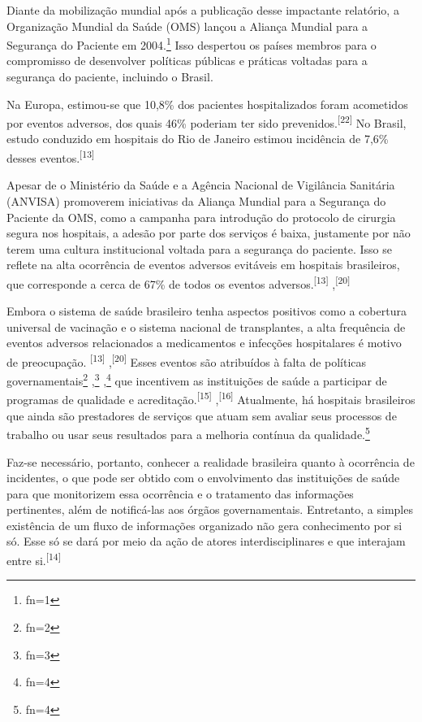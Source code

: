 \documentclass{article}
\makeatletter
\newcommand{\fn}{\afterassignment\fn@aux\count0=}
\newcommand{\fn@aux}{\csname fn\the\count0\endcsname}
\makeatother
\begin{document}
Diante da mobilização mundial após a publicação desse impactante relatório, a
Organização
Mundial da Saúde (OMS) lançou a Aliança Mundial para a Segurança do Paciente em
2004.\footnote{\fn1}
Isso despertou os países membros para o compromisso de desenvolver políticas
públicas e práticas voltadas para a segurança do paciente, incluindo o Brasil.

Na Europa, estimou-se que 10,8\% dos pacientes hospitalizados foram acometidos
por eventos
adversos, dos quais 46\% poderiam ter sido prevenidos.\textsuperscript{[22]}
No Brasil, estudo conduzido em hospitais do Rio de Janeiro estimou incidência de
7,6\% desses eventos.\textsuperscript{[13]}

Apesar de o Ministério da Saúde e a Agência Nacional de Vigilância Sanitária
(ANVISA)
promoverem iniciativas da Aliança Mundial para a Segurança do Paciente da OMS,
como a
campanha para introdução do protocolo de cirurgia segura nos hospitais, a adesão
por parte
dos serviços é baixa, justamente por não terem uma cultura institucional voltada
para a
segurança do paciente. Isso se reflete na alta ocorrência de eventos adversos
evitáveis em
hospitais brasileiros, que corresponde a cerca de 67\% de todos os eventos
adversos.\textsuperscript{[13]}
,\textsuperscript{[20]}

Embora o sistema de saúde brasileiro tenha aspectos positivos como a cobertura
universal de
vacinação e o sistema nacional de transplantes, a alta frequência de eventos
adversos
relacionados a medicamentos e infecções hospitalares é motivo de preocupação.
\textsuperscript{[13]}
,\textsuperscript{[20]}
Esses eventos são atribuídos à falta de políticas governamentais\footnote{\fn2}
,\footnote{\fn3}
,\footnote{\fn4}
que incentivem as instituições de saúde a participar de programas de qualidade e
acreditação.\textsuperscript{[15]}
,\textsuperscript{[16]}
Atualmente, há hospitais brasileiros que ainda são prestadores de serviços que
atuam
sem avaliar seus processos de trabalho ou usar seus resultados para a melhoria
contínua da
qualidade.\footnote{\fn4}

Faz-se necessário, portanto, conhecer a realidade brasileira quanto à ocorrência
de
incidentes, o que pode ser obtido com o envolvimento das instituições de saúde
para que
monitorizem essa ocorrência e o tratamento das informações pertinentes, além de
notificá-las
aos órgãos governamentais. Entretanto, a simples existência de um fluxo de
informações
organizado não gera conhecimento por si só. Esse só se dará por meio da ação de
atores
interdisciplinares e que interajam entre si.\textsuperscript{[14]}
\end{document}
